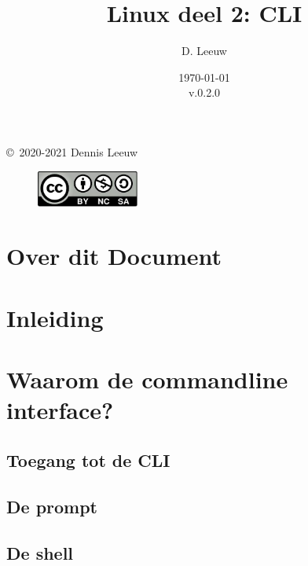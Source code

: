 \documentclass[a4paper,12pt,twoside,openright,titlepage]{book}
\author{D. Leeuw}
\title{Linux deel 2: CLI}
\date{\today\\v.0.2.0}
\begin{document}

\maketitle

\copyright\ 2020-2021 Dennis Leeuw\\

\begin{figure}
\includegraphics[width=0.3\textwidth]{CC-BY-SA-NC.png}
\end{figure}

\bigskip




\frontmatter
\chapter{Over dit Document}



\tableofcontents

\mainmatter
\chapter{Inleiding}


\chapter{Waarom de commandline interface?}

\section{Toegang tot de CLI}

\section{De prompt}

\section{De shell}

\end{document}
